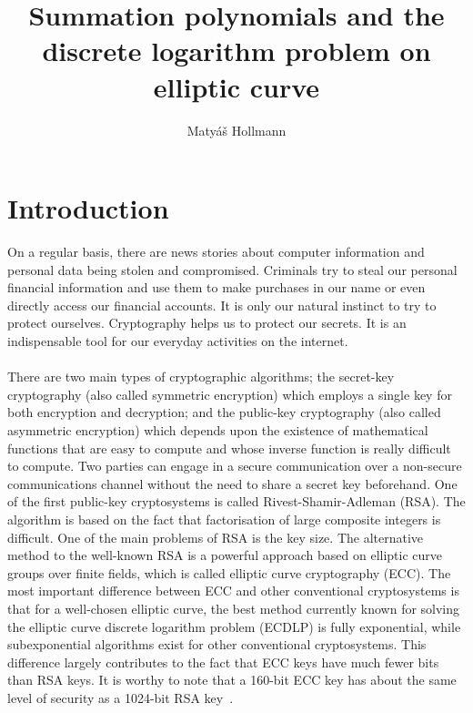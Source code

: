 \documentclass[thesis=M,english]{FITthesis}[2012/10/20]
\title{Summation polynomials and the discrete logarithm problem on elliptic curve}
\author{Matyáš Hollmann} %
\theoremstyle{remark}
\theoremstyle{definition}
\begin{document}
\chapter{Introduction}
On a regular basis, there are news stories about computer information and personal data being stolen and compromised. Criminals try to steal our personal financial information and use them to make purchases in our name or even directly access our financial accounts. It is only our natural instinct to try to protect ourselves. Cryptography helps us to protect our secrets. It is an indispensable tool for our everyday activities on the internet. \\ \\
\noindent There are two main types of cryptographic algorithms; the secret-key cryptography (also called symmetric encryption) which employs a single key for both encryption and decryption; and the public-key cryptography (also called asymmetric encryption) which depends upon the existence of mathematical functions that are easy to compute and whose inverse function is really difficult to compute. Two parties can engage in a secure communication over a non-secure communications channel without the need to share a secret key beforehand. One of the first public-key cryptosystems is called Rivest-Shamir-Adleman (RSA). The algorithm is based on the fact that factorisation of large composite integers is difficult. One of the main problems of RSA is the key size. The alternative method to the well-known RSA is a powerful approach based on elliptic curve groups over finite fields, which is called elliptic curve cryptography (ECC). The most important difference between ECC and other conventional cryptosystems is that for a well-chosen elliptic curve, the best method currently known for solving the elliptic curve discrete logarithm problem (ECDLP) is fully exponential, while subexponential algorithms exist for other conventional cryptosystems. This difference largely contributes to the fact that ECC keys have much fewer bits than RSA keys. It is worthy to note that a 160-bit ECC key has about the same level of security as a 1024-bit RSA key~\cite{secTest}.
\\
\\
\noindent 
\end{document}
